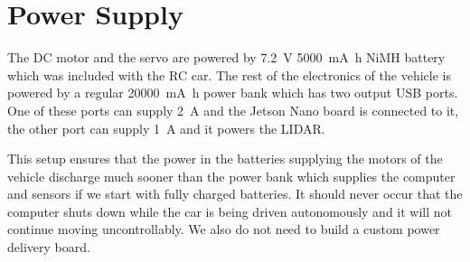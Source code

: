\section{Power Supply}

The \gls*{DC} motor and the servo are powered by \SI{7.2}{\volt} \SI{5000}{\milli\ampere\hour} NiMH battery which was included with the \gls*{RC} car. The rest of the electronics of the vehicle is powered by a regular \SI{20000}{\milli\ampere\hour} power bank which has two output USB ports. One of these ports can supply \SI{2}{\ampere} and the Jetson Nano board is connected to it, the other port can supply \SI{1}{\ampere} and it powers the \gls*{LIDAR}.

This setup ensures that the power in the batteries supplying the motors of the vehicle discharge much sooner than the power bank which supplies the computer and sensors if we start with fully charged batteries. It should never occur that the computer shuts down while the car is being driven autonomously and it will not continue moving uncontrollably. We also do not need to build a custom power delivery board.
